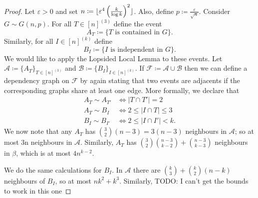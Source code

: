 \documentclass{report}
\DeclarePairedDelimiter\floor{\lfloor}{\rfloor}
\theoremstyle{definition}
\theoremstyle{plain}
\theoremstyle{definition}
\begin{document}
	\begin{proof}
		Let $\varepsilon > 0$ and set $n \coloneqq \floor{\varepsilon^4 \left(\frac{k}{\log k}\right)^2}$. Also, define $p \coloneqq \frac{\varepsilon}{\sqrt{n}}$. Consider $G\sim G(n,p)$. For all $T \in [n]^{(3)}$ define the event
		\[
			A_T \coloneqq \{T \text{ is contained in }G\}.
		\]
		Similarly, for all $I\in [n]^{(k)}$ define
		\[
			B_I \coloneqq \{I \text{ is independent in }G\}.
		\]
		We would like to apply the Lopsided Local Lemma to these events. Let $\mathcal{A} \coloneqq \{A_T\}_{T\in[n]^{(3)}}$ and $\mathcal{B} \coloneqq \{B_I\}_{I\in [n]^{(k)}}$. If $\mathcal{F} \coloneqq \mathcal{A} \cup \mathcal{B}$ then we can define a dependency graph on $\mathcal{F}$ by again stating that two events are adjacents if the corresponding graphs share at least one edge. More formally, we declare that
		\begin{align*}
			A_T \sim A_{T'} &\iff |T\cap T'| = 2\\
			A_T \sim B_I &\iff 2\leq |I \cap T| \leq 3\\
			B_I \sim B_{I'} &\iff 2\leq |I\cap I'| < k.
		\end{align*}
		We now note that any $A_T$ has $\binom{3}{2}(n - 3) = 3(n-3)$ neighbours in $\mathcal{A}$; so at most 3n neighbours in $\mathcal{A}$. Similarly, $A_T$ has $\binom{3}{2}\binom{n-3}{k-2} + \binom{n-3}{k-3}$ neighbours in $\beta$, which is at most $4n^{k-2}$.
		
		We do the same calculations for $B_I$. In $\mathcal{A}$ there are $\binom{k}{3} + \binom{k}{2} (n-k)$ neighbours of $B_I$, so at most $nk^2 + k^3$. Similarly, 
		{\color{red}TODO: I can't get the bounds to work in this one}
	\end{proof}
	
\end{document}
